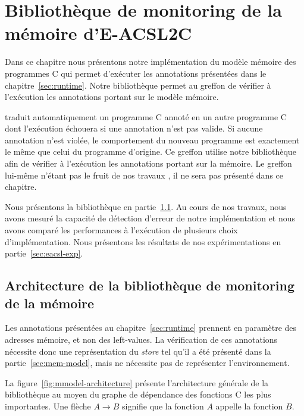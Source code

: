 
\chapter{Bibliothèque de monitoring de la mémoire d'E-ACSL2C}
\label{sec:eacsl}

\chapterintro


Dans ce chapitre nous présentons notre implémentation du modèle mémoire des
programmes C qui permet d'exécuter les annotations \eacsl présentées dans
le chapitre~\ref{sec:runtime}.
Notre bibliothèque permet au greffon \eacsltoc de vérifier à l'exécution les
annotations \eacsl portant sur le modèle mémoire.

\eacsltoc traduit automatiquement un programme C annoté en un autre
programme C dont l'exécution échouera si une annotation n'est pas valide.
Si aucune annotation n'est violée, le comportement
du nouveau programme est exactement le même que celui du programme d'origine.
Ce greffon utilise notre bibliothèque afin de vérifier à l'exécution les
annotations \eacsl portant sur la mémoire.
Le greffon \eacsltoc lui-même n'étant pas le fruit de nos travaux
\cite{Delahaye/SAC13}, il ne sera pas présenté dans ce chapitre.

Nous présentons la bibliothèque en partie~\ref{sec:eacsl-impl}.
Au cours de nos travaux, nous avons mesuré la capacité de détection d'erreur de
notre implémentation et nous avons comparé les performances à l'exécution de
plusieurs choix d'implémentation.
Nous présentons les résultats de nos expérimentations en
partie~\ref{sec:eacsl-exp}.


\section{Architecture de la bibliothèque de monitoring de la mémoire}
\label{sec:eacsl-impl}


Les annotations présentées au chapitre~\ref{sec:runtime} prennent en paramètre
des adresses mémoire, et non des left-values.
La vérification de ces annotations nécessite donc une représentation du
{\em store} tel qu'il a été présenté dans la partie~\ref{sec:mem-model}, mais ne
nécessite pas de représenter l'environnement.

La figure~\ref{fig:mmodel-architecture} présente l'architecture générale de la
bibliothèque au moyen du graphe de dépendance des fonctions C les plus
importantes.
Une flèche $A \rightarrow B$ signifie que la fonction $A$ appelle la fonction
$B$.

